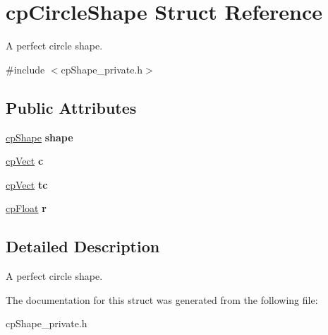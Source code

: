 \hypertarget{structcp_circle_shape}{}\section{cp\+Circle\+Shape Struct Reference}
\label{structcp_circle_shape}


A perfect circle shape.  




{\ttfamily \#include $<$cp\+Shape\+\_\+private.\+h$>$}

\subsection*{Public Attributes}
\begin{DoxyCompactItemize}
\item 
\hypertarget{structcp_circle_shape_a36cd91d5e626457fee162f22aa6c3acc}{}\hyperlink{structcp_shape}{cp\+Shape} {\bfseries shape}\label{structcp_circle_shape_a36cd91d5e626457fee162f22aa6c3acc}

\item 
\hypertarget{structcp_circle_shape_a7e8afd3b3517b245e32e52ec34591820}{}\hyperlink{structcp_vect}{cp\+Vect} {\bfseries c}\label{structcp_circle_shape_a7e8afd3b3517b245e32e52ec34591820}

\item 
\hypertarget{structcp_circle_shape_acff09931d945f2af021449c232f51f35}{}\hyperlink{structcp_vect}{cp\+Vect} {\bfseries tc}\label{structcp_circle_shape_acff09931d945f2af021449c232f51f35}

\item 
\hypertarget{structcp_circle_shape_a54e5d26ce462ecc786ac5ab411ebcebd}{}\hyperlink{group__basic_types_gac1ed65573e035bf892505768c852d8d3}{cp\+Float} {\bfseries r}\label{structcp_circle_shape_a54e5d26ce462ecc786ac5ab411ebcebd}

\end{DoxyCompactItemize}


\subsection{Detailed Description}
A perfect circle shape. 

The documentation for this struct was generated from the following file\+:\begin{DoxyCompactItemize}
\item 
cp\+Shape\+\_\+private.\+h\end{DoxyCompactItemize}
